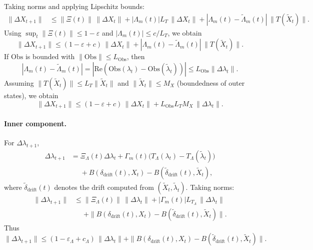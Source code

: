 \documentclass[11pt]{article}
\begin{document}
Taking norms and applying Lipschitz bounds:
\begin{align*}
\|\Delta X_{t+1}\|
&\le \|\Xi(t)\|\,\|\Delta X_t\|
   + |\Lambda_m(t)|L_T\,\|\Delta X_t\|
   + |\Lambda_m(t)-\tilde{\Lambda}_m(t)|\,\|T(\tilde{X}_t)\|.
\end{align*}
Using $\sup_t\|\Xi(t)\|\le 1-\varepsilon$ and $|\Lambda_m(t)|\le c/L_T$, we obtain
\[
\|\Delta X_{t+1}\|
\le (1-\varepsilon+c)\,\|\Delta X_t\|
   + |\Lambda_m(t)-\tilde{\Lambda}_m(t)|\,\|T(\tilde{X}_t)\|.
\]
If $\mathrm{Obs}$ is bounded with $\|\mathrm{Obs}\|\le L_{\mathrm{Obs}}$, then
\[
|\Lambda_m(t)-\tilde{\Lambda}_m(t)|
= |\mathrm{Re}(\mathrm{Obs}(\lambda_t)-\mathrm{Obs}(\tilde{\lambda}_t))|
\le L_{\mathrm{Obs}}\|\Delta\lambda_t\|.
\]
Assuming $\|T(\tilde{X}_t)\|\le L_T\|\tilde{X}_t\|$ and $\|\tilde{X}_t\|\le M_X$ (boundedness of outer states), we obtain
\begin{equation}
\|\Delta X_{t+1}\|
\le (1-\varepsilon+c)\,\|\Delta X_t\|
   + L_{\mathrm{Obs}} L_T M_X\,\|\Delta\lambda_t\|.
\label{eq:A-DeltaX-bound}
\end{equation}

\paragraph{Inner component.} For $\Delta\lambda_{t+1}$,
\begin{align*}
\Delta\lambda_{t+1}
&= \Xi_\Lambda(t)\Delta\lambda_t 
   + \Gamma_m(t)\bigl(T_\Lambda(\lambda_t)-T_\Lambda(\tilde{\lambda}_t)\bigr)\\
&\phantom{=} + B(\delta_{\mathrm{drift}}(t),X_t) 
   - B(\tilde{\delta}_{\mathrm{drift}}(t),\tilde{X}_t),
\end{align*}
where $\tilde{\delta}_{\mathrm{drift}}(t)$ denotes the drift computed from $(\tilde{X}_t,\tilde{\lambda}_t)$. Taking norms:
\begin{align*}
\|\Delta\lambda_{t+1}\|
&\le \|\Xi_\Lambda(t)\|\,\|\Delta\lambda_t\|
   + |\Gamma_m(t)|L_{T_\Lambda}\,\|\Delta\lambda_t\| \\
&\phantom{\le} + \|B(\delta_{\mathrm{drift}}(t),X_t)
                 - B(\tilde{\delta}_{\mathrm{drift}}(t),\tilde{X}_t)\|.
\end{align*}
Thus
\begin{equation}
\|\Delta\lambda_{t+1}\|
\le (1-\varepsilon_\Lambda+c_\Lambda)\,\|\Delta\lambda_t\|
   + \|B(\delta_{\mathrm{drift}}(t),X_t)
       - B(\tilde{\delta}_{\mathrm{drift}}(t),\tilde{X}_t)\|.
\label{eq:A-DeltaLambda-preB}
\end{equation}
\end{document}
